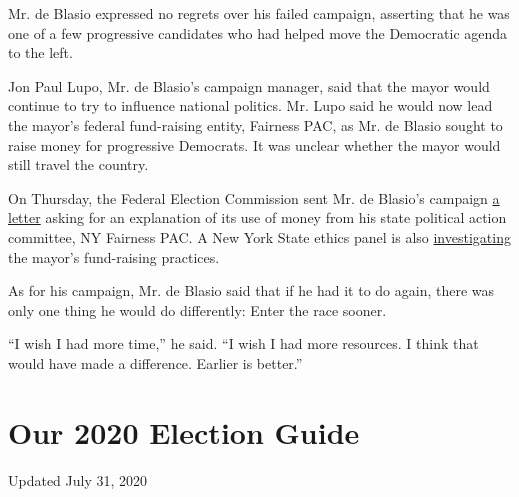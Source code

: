 Mr. de Blasio expressed no regrets over his failed campaign, asserting
that he was one of a few progressive candidates who had helped move the
Democratic agenda to the left.

Jon Paul Lupo, Mr. de Blasio's campaign manager, said that the mayor
would continue to try to influence national politics. Mr. Lupo said he
would now lead the mayor's federal fund-raising entity, Fairness PAC, as
Mr. de Blasio sought to raise money for progressive Democrats. It was
unclear whether the mayor would still travel the country.

On Thursday, the Federal Election Commission sent Mr. de Blasio's
campaign
\href{https://docquery.fec.gov/pdf/058/201909190300048058/201909190300048058.pdf}{a
letter} asking for an explanation of its use of money from his state
political action committee, NY Fairness PAC. A New York State ethics
panel is also
\href{https://www.nytimes.com/2019/09/19/nyregion/de-blasio-2020-ethics.html?rref=collection\%2Fbyline\%2Fjeffery-c.-mays\&action=click\&contentCollection=undefined\&region=stream\&module=stream_unit\&version=latest\&contentPlacement=2\&pgtype=collection}{investigating}
the mayor's fund-raising practices.

As for his campaign, Mr. de Blasio said that if he had it to do again,
there was only one thing he would do differently: Enter the race sooner.

``I wish I had more time,'' he said. ``I wish I had more resources. I
think that would have made a difference. Earlier is better.''

\hypertarget{our-2020-election-guide}{%
\section{Our 2020 Election Guide}\label{our-2020-election-guide}}

Updated July 31, 2020

